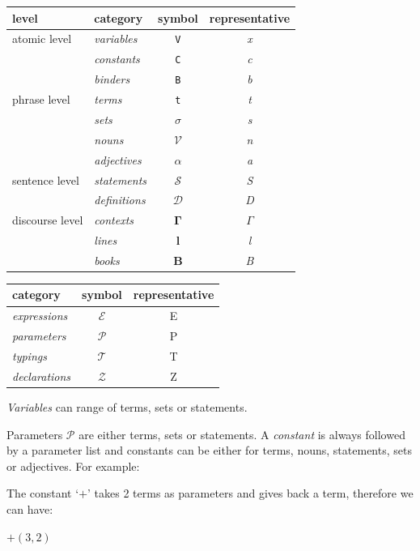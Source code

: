 \begin{table}[H]
\centering
\begin{tabular}{|l|l|c|c|}
\hline
level & category & symbol & representative \\
\hline
atomic level & \emph{variables} & \texttt{V} & \emph{x} \\
& \emph{constants} &  \texttt{C} & \emph{c} \\
& \emph{binders} &  \texttt{B} & \emph{b} \\
\hline
phrase level & \emph{terms} & \texttt{t} & \emph{t} \\
& \emph{sets} & $\sigma$ & \emph{s} \\
& \emph{nouns} & $\mathcal{V}$ & \emph{n} \\
& \emph{adjectives} & $\alpha$ & \emph{a} \\
\hline
sentence level & \emph{statements} & $\mathcal{S}$ & \emph{S} \\
& \emph{definitions} & $\mathcal{D}$ & \emph{D} \\
\hline
discourse level & \emph{contexts} & $\mathbf{\Gamma}$ & $\Gamma$ \\
& \emph{lines} & \textbf{l} & \emph{l} \\
& \emph{books} & \textbf{B} & \emph{B} \\
\hline
\end{tabular}

\begin{tabular}{|l|c|c|}
\hline
category & symbol & representative \\
\hline
\emph{expressions} & $\mathcal{E}$ & E \\
\hline
\emph{parameters} & $\mathcal{P}$ & P \\
\hline
\emph{typings} & $\mathcal{T}$ & T \\
\emph{declarations} & $\mathcal{Z}$ & Z \\
\hline
\end{tabular}
\end{table}

\emph{Variables} can range of terms, sets or statements.

Parameters $\mathcal{P}$ are either terms, sets or statements. A \emph{constant} is always followed by a parameter list and constants can be either for terms, nouns, statements, sets or adjectives. For example:


\noindent The constant `$+$' takes 2 terms as parameters and gives back a term, therefore we can have:

\begin{center}
$+(3, 2)$
\end{center}

